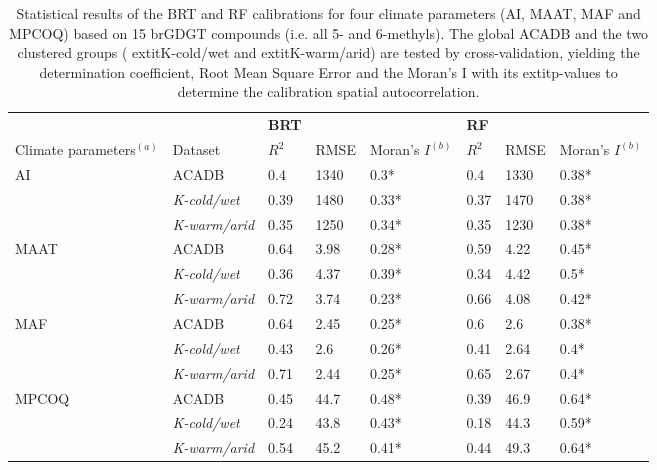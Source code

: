 \begin{table}[ht]
\centering
\caption{Statistical results of the BRT and RF calibrations for four climate parameters (AI, MAAT, MAF and MPCOQ) based on 15 brGDGT compounds (i.e. all 5- and 6-methyls). The global ACADB and the two clustered groups (	extit{K-cold/wet} and 	extit{K-warm/arid}) are tested by cross-validation, yielding the determination coefficient, Root Mean Square Error and the Moran's I with its 	extit{p}-values to determine the calibration spatial autocorrelation.} 
\label{FT_table}
\begin{tabular}{llllllll}
  \toprule
 &  & \textbf{BRT} &  &  & \textbf{RF} &  &  \\ 
 Climate parameters$^{(a)}$ & Dataset & $R^2$ & RMSE & Moran's $I^{(b)}$ & $R^2$ & RMSE & Moran's $I^{(b)}$ \\ 
   \midrule
AI & ACADB & 0.4 & 1340 & 0.3* & 0.4 & 1330 & 0.38* \\ 
   & \textit{K-cold/wet} & 0.39 & 1480 & 0.33* & 0.37 & 1470 & 0.38* \\ 
   & \textit{K-warm/arid} & 0.35 & 1250 & 0.34* & 0.35 & 1230 & 0.38* \\ 
   \midrule
MAAT & ACADB & 0.64 & 3.98 & 0.28* & 0.59 & 4.22 & 0.45* \\ 
   & \textit{K-cold/wet} & 0.36 & 4.37 & 0.39* & 0.34 & 4.42 & 0.5* \\ 
   & \textit{K-warm/arid} & 0.72 & 3.74 & 0.23* & 0.66 & 4.08 & 0.42* \\ 
   \midrule
MAF & ACADB & 0.64 & 2.45 & 0.25* & 0.6 & 2.6 & 0.38* \\ 
   & \textit{K-cold/wet} & 0.43 & 2.6 & 0.26* & 0.41 & 2.64 & 0.4* \\ 
   & \textit{K-warm/arid} & 0.71 & 2.44 & 0.25* & 0.65 & 2.67 & 0.4* \\ 
   \midrule
MPCOQ & ACADB & 0.45 & 44.7 & 0.48* & 0.39 & 46.9 & 0.64* \\ 
   & \textit{K-cold/wet} & 0.24 & 43.8 & 0.43* & 0.18 & 44.3 & 0.59* \\ 
   & \textit{K-warm/arid} & 0.54 & 45.2 & 0.41* & 0.44 & 49.3 & 0.64* \\ 
   \bottomrule
\end{tabular}
\end{table}
